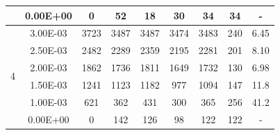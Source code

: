 \begin{table}[H]
{\begin{tabular}{|c|c|c|c|c|c|c|c|c|}
                               & 0.00E+00         & 0         & 52                                                         & 18                                                        & 30                                                        & 34      & 34     & -                                                                  \\ \hline
            \multirow{6}{*}{4} & 3.00E-03         & 3723      & 3487                                                       & 3487                                                      & 3474                                                      & 3483    & 240    & 6.45                                                               \\ \cline{2-9}
                               & 2.50E-03         & 2482      & 2289                                                       & 2359                                                      & 2195                                                      & 2281    & 201    & 8.10                                                               \\ \cline{2-9}
                               & 2.00E-03         & 1862      & 1736                                                       & 1811                                                      & 1649                                                      & 1732    & 130    & 6.98                                                               \\ \cline{2-9}
                               & 1.50E-03         & 1241      & 1123                                                       & 1182                                                      & 977                                                       & 1094    & 147    & 11.8                                                               \\ \cline{2-9}
                               & 1.00E-03         & 621       & 362                                                        & 431                                                       & 300                                                       & 365     & 256    & 41.2                                                               \\ \cline{2-9}
                               & 0.00E+00         & 0         & 142                                                        & 126                                                       & 98                                                        & 122     & 122    & -                                                                  \\ \hline

\end{tabular}}
\end{table}

